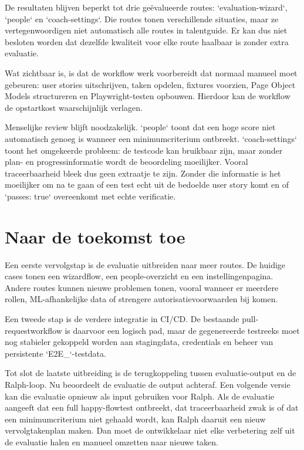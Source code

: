 De resultaten blijven beperkt tot drie geëvalueerde routes: `evaluation-wizard`, `people` en `coach-settings`. Die routes tonen verschillende situaties, maar ze vertegenwoordigen niet automatisch alle routes in talentguide. Er kan dus niet besloten worden dat dezelfde kwaliteit voor elke route haalbaar is zonder extra evaluatie.

Wat  zichtbaar is, is dat de workflow werk voorbereidt dat normaal manueel moet gebeuren: user stories uitschrijven, taken opdelen, fixtures voorzien, Page Object Models structureren en Playwright-testen opbouwen. Hierdoor kan de workflow de opstartkost waarschijnlijk verlagen.

Menselijke review blijft noodzakelijk. `people` toont dat een hoge score niet automatisch genoeg is wanneer een minimumcriterium ontbreekt. `coach-settings` toont het omgekeerde probleem: de testcode kan bruikbaar zijn, maar zonder plan- en progressinformatie wordt de beoordeling moeilijker. Vooral traceerbaarheid bleek dus geen extraatje te zijn. Zonder die informatie is het moeilijker om na te gaan of een test echt uit de bedoelde user story komt en of `passes: true` overeenkomt met echte verificatie.

\section{Naar de toekomst toe}

Een eerste vervolgstap is de evaluatie uitbreiden naar meer routes. De huidige cases tonen een wizardflow, een people-overzicht en een instellingenpagina. Andere routes kunnen nieuwe problemen tonen, vooral wanneer er meerdere rollen, ML-afhankelijke data of strengere autorisatievoorwaarden bij komen.

Een tweede stap is de verdere integratie in CI/CD. De bestaande pull-requestworkflow is daarvoor een logisch pad, maar de gegenereerde testreeks moet nog stabieler gekoppeld worden aan stagingdata, credentials en beheer van persistente `E2E_`-testdata.

Tot slot de laatste uitbreiding is de terugkoppeling tussen evaluatie-output en de Ralph-loop. Nu beoordeelt de evaluatie de output achteraf. Een volgende versie kan die evaluatie opnieuw als input gebruiken voor Ralph. Als de evaluatie aangeeft dat een full happy-flowtest ontbreekt, dat traceerbaarheid zwak is of dat een minimumcriterium niet gehaald wordt, kan Ralph daaruit een nieuw vervolgtakenplan maken. Dan moet de ontwikkelaar niet elke verbetering zelf uit de evaluatie halen en manueel omzetten naar nieuwe taken.
